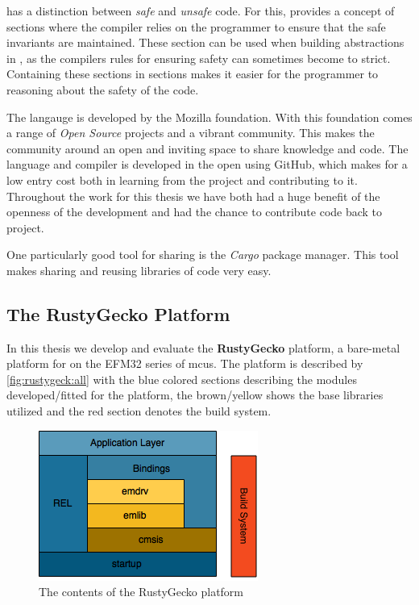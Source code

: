 {\rust} has a distinction between \emph{safe} and \emph{unsafe} code.
For this, {\rust} provides a concept of {\unsafe} sections where the compiler relies on the programmer to ensure that the safe invariants are maintained.
These section can be used when building abstractions in {\rust}, as the compilers rules for ensuring safety can sometimes become to strict.
Containing these sections in {\unsafe} sections makes it easier for the programmer to reasoning about the safety of the code.

The {\rust} langauge is developed by the Mozilla foundation.
With this foundation comes a range of \emph{Open Source} projects and a vibrant community.
This makes the community around {\rust} an open and inviting space to share knowledge and code.
The {\rust} language and compiler is developed in the open using GitHub, which makes for a low entry cost both in learning from the project and contributing to it.
Throughout the work for this thesis we have both had a huge benefit of the openness of the development and had the chance to contribute code back to project.

One particularly good tool for sharing {\rust} is the \emph{Cargo} package manager.
This tool makes sharing and reusing libraries of code very easy.

\subsection{The RustyGecko Platform}

In this thesis we develop and evaluate the \textbf{RustyGecko} platform, a bare-metal platform for {\rust} on the EFM32 series of \glspl{mcu}.
The platform is described by \autoref{fig:rustygeck:all} with the blue colored sections describing the {\rust} modules developed/fitted for the platform, the brown/yellow shows the base {\C} libraries utilized and the red section denotes the build system.
\begin{figure}[H]
  \begin{center}
    \includegraphics{figures/RustyGecko-all.png}
  \end{center}
  \caption{The contents of the RustyGecko platform}
  \label{fig:rustygecko:all}
\end{figure}

